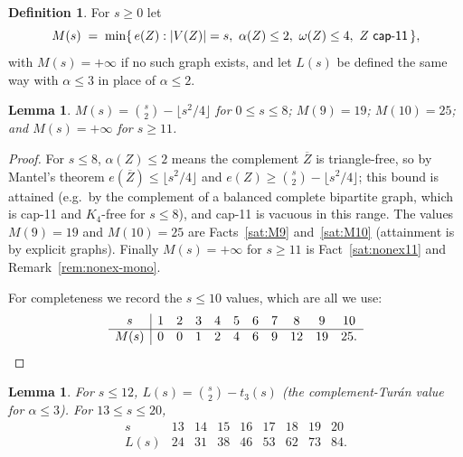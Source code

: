 \documentclass[11pt,reqno]{amsart}
\newtheorem{lemma}[theorem]{Lemma}
\theoremstyle{definition}
\newtheorem{definition}[theorem]{Definition}
\theoremstyle{remark}
\newcommand{\abs}[1]{\left|#1\right|}
\newcommand{\capeleven}{\textsf{cap-11}}
\begin{document}
\begin{definition}
For $s\ge 0$ let
\[
  M(s)\;=\;\min\{\, e(Z) : \abs{V(Z)}=s,\ \alpha(Z)\le 2,\ \omega(Z)\le 4,\
  Z\text{ \capeleven}\,\},
\]
with $M(s)=+\infty$ if no such graph exists, and let $L(s)$ be defined the same
way with $\alpha\le 3$ in place of $\alpha\le 2$.
\end{definition}

\begin{lemma}\label{lem:Mtable}
$M(s)=\binom s2-\lfloor s^2/4\rfloor$ for $0\le s\le 8$; $M(9)=19$; $M(10)=25$;
and $M(s)=+\infty$ for $s\ge 11$.
\end{lemma}

\begin{proof}
For $s\le 8$, $\alpha(Z)\le 2$ means the complement $\overline Z$ is triangle-free,
so by Mantel's theorem $e(\overline Z)\le\lfloor s^2/4\rfloor$ and
$e(Z)\ge\binom s2-\lfloor s^2/4\rfloor$; this bound is attained (e.g.\ by the
complement of a balanced complete bipartite graph, which is \capeleven{} and
$K_4$-free for $s\le 8$), and \capeleven{} is vacuous in this range. The values
$M(9)=19$ and $M(10)=25$ are Facts~\ref{sat:M9} and~\ref{sat:M10} (attainment is by
explicit graphs). Finally $M(s)=+\infty$ for $s\ge 11$ is
Fact~\ref{sat:nonex11} and Remark~\ref{rem:nonex-mono}.

For completeness we record the $s\le 10$ values, which are all we use:
\[
  \begin{array}{c|cccccccccc}
    s & 1 & 2 & 3 & 4 & 5 & 6 & 7 & 8 & 9 & 10\\\hline
    M(s) & 0 & 0 & 1 & 2 & 4 & 6 & 9 & 12 & 19 & 25.
  \end{array}\qedhere
\]
\end{proof}

\begin{lemma}\label{lem:Ltable}
For $s\le 12$, $L(s)=\binom s2-t_3(s)$ \textup{(the complement-Tur\'an value for
$\alpha\le 3$)}. For $13\le s\le 20$,
\[
  \begin{array}{c|cccccccc}
    s & 13 & 14 & 15 & 16 & 17 & 18 & 19 & 20\\\hline
    L(s) & 24 & 31 & 38 & 46 & 53 & 62 & 73 & 84 .
  \end{array}
\]
\end{lemma}
\end{document}
